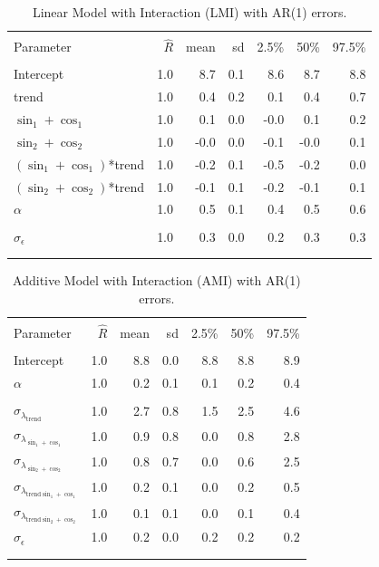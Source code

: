 \documentclass{article}\usepackage[]{graphicx}\usepackage[]{color}
\begin{document}
\begin{table}[bp!]
\caption{Linear Model with Interaction (LMI) with AR(1) errors.}
\label{lmi_ar}
\centering
\begin{tabular}{lrrrrrr}
\\[-1.8ex]\hline 
\hline \\[-1.8ex] 
Parameter & $\hat{R}$  & mean & sd & 2.5\% & 50\% & 97.5\% \\ 
\hline \\[-1.8ex] 
Intercept & 1.0 & 8.7 & 0.1 & 8.6 & 8.7 & 8.8 \\ 
trend & 1.0 & 0.4 & 0.2 & 0.1 & 0.4 & 0.7 \\ 
$\sin_{1} + \cos_{1}$ & 1.0 & 0.1 & 0.0 & -0.0 & 0.1 & 0.2 \\ 
$\sin_{2} + \cos_{2}$ & 1.0 & -0.0 & 0.0 & -0.1 & -0.0 & 0.1 \\ 
$(\sin_{1} + \cos_{1})$*trend & 1.0 & -0.2 & 0.1 & -0.5 & -0.2 & 0.0 \\ 
$(\sin_{2} + \cos_{2})$*trend  & 1.0 & -0.1 & 0.1 & -0.2 & -0.1 & 0.1 \\ 
$\alpha$ & 1.0 & 0.5 & 0.1 & 0.4 & 0.5 & 0.6 \\ 
  \hline \\[-1.8ex] 
$\sigma_{\epsilon}$ & 1.0 & 0.3 & 0.0 & 0.2 & 0.3 & 0.3 \\ 
\\[-1.8ex]\hline 
\hline \\[-1.8ex] 
\end{tabular}
\end{table}


\begin{table}[bp!]
\caption{Additive Model with Interaction (AMI) with AR(1) errors.}
\label{ami_ar}
\centering
\begin{tabular}{lrrrrrr}
\\[-1.8ex]\hline 
\hline \\[-1.8ex] 
Parameter & $\hat{R}$  & mean & sd & 2.5\% & 50\% & 97.5\% \\ 
\hline \\[-1.8ex] 
Intercept & 1.0 & 8.8 & 0.0 & 8.8 & 8.8 & 8.9 \\ 
$\alpha$ & 1.0 & 0.2 & 0.1 & 0.1 & 0.2 & 0.4 \\ 
\hline \\[-1.8ex] 
$\sigma_{\lambda_{\text{trend}}}$ & 1.0 & 2.7 & 0.8 & 1.5 & 2.5 & 4.6 \\ 
$\sigma_{\lambda_{\sin_{1}+\cos_{1}}}$  & 1.0 & 0.9 & 0.8 & 0.0 & 0.8 & 2.8 \\ 
$\sigma_{\lambda_{\sin_{2}+\cos_{2}}}$  & 1.0 & 0.8 & 0.7 & 0.0 & 0.6 & 2.5 \\ 
$\sigma_{\lambda_{\text{trend} \sin_{1}+\cos_{1}}}$  & 1.0 & 0.2 & 0.1 & 0.0 & 0.2 & 0.5 \\ 
$\sigma_{\lambda_{\text{trend} \sin_{2}+\cos_{2}}}$  & 1.0 & 0.1 & 0.1 & 0.0 & 0.1 & 0.4 \\ 
$\sigma_{\epsilon}$ & 1.0 & 0.2 & 0.0 & 0.2 & 0.2 & 0.2 \\ 

\\[-1.8ex]\hline 
\hline \\[-1.8ex] 
\end{tabular}
\end{table}
\end{document}
